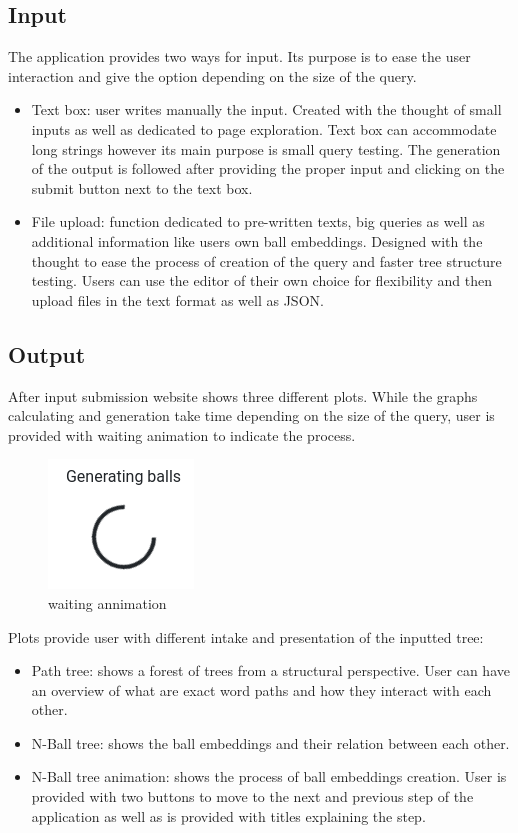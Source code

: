 \documentclass[]{article}
\begin{document}
\subsection{Input}
The application provides two ways for input. Its purpose is to ease the user interaction and give the option depending on the size of the query. 

\begin{itemize}
	\item Text box: user writes manually the input. Created with the thought of small inputs as well as dedicated to page exploration. Text box can accommodate long strings however its main purpose is small query testing. The generation of the output is followed after providing the proper input and clicking on the submit button next to the text box.
	\item  File upload: function dedicated to pre-written texts, big queries as well as additional information like users own ball embeddings. Designed with the thought to ease the process of creation of the query and faster tree structure testing. Users can use the editor of their own choice for flexibility and then upload files in the text format as well as JSON. 
\end{itemize}


\subsection{Output}
After input submission website shows three different plots. While the graphs calculating and generation take time depending on the size of the query, user is provided with waiting animation to indicate the process. 

\begin{figure}[H]
	\centering
	\includegraphics[scale=0.5]{res/waiting.png}
	\caption{waiting annimation}
	\label{fig:waiting}
\end{figure}


Plots provide user with different intake and presentation of the inputted tree:
\begin{itemize}
	\item Path tree: shows a forest of trees from a structural perspective. User can have an overview of what are exact word paths and how they interact with each other.
	\item N-Ball tree: shows the ball embeddings and their relation between each other.
	\item N-Ball tree animation: shows the process of ball embeddings creation. User is provided with two buttons to move to the next and previous step of the application as well as is provided with titles explaining the step.	
\end{itemize}
\end{document}
